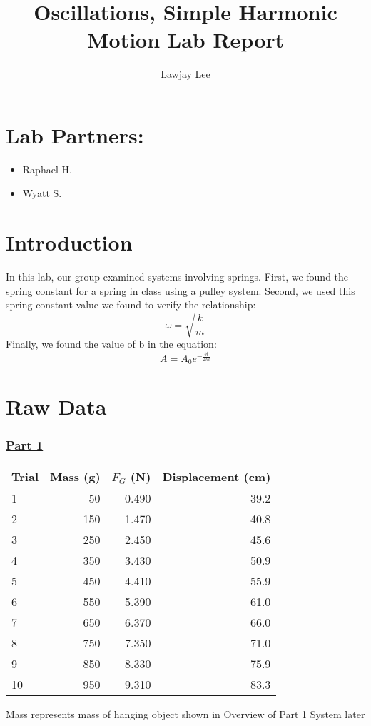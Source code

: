 \documentclass[fleqn]{article}
\title{Oscillations, Simple Harmonic Motion Lab Report}
\author{Lawjay Lee}
\date{}
\begin{document}
\maketitle

\section*{Lab Partners:}
\begin{itemize}
	\item Raphael H.
	\item Wyatt S.
\end{itemize}

\section*{Introduction}
In this lab, our group examined systems involving springs. First, we found the spring constant for a spring in class using a pulley system. Second, we used this spring constant value we found to verify the relationship:
\[ \omega = \sqrt{\frac{k}{m} }  \]
Finally, we found the value of b in the equation:
\[ A = A_0e^{- \frac{bt}{2m} } \]

\section*{Raw Data}
\subsubsection*{\underline{Part 1}}
\begin{table}[H]
	\setlength{\extrarowheight}{2pt}
	\begin{tabular}{|l|r|r|r|}
		\hline
		Trial & Mass (g) & $F_G$ (N) & Displacement (cm) \\ \hline
		1     & 50       & 0.490     & 39.2              \\ \hline
		2     & 150      & 1.470     & 40.8              \\ \hline
		3     & 250      & 2.450     & 45.6              \\ \hline
		4     & 350      & 3.430     & 50.9              \\ \hline
		5     & 450      & 4.410     & 55.9              \\ \hline
		6     & 550      & 5.390     & 61.0              \\ \hline
		7     & 650      & 6.370     & 66.0              \\ \hline
		8     & 750      & 7.350     & 71.0              \\ \hline
		9     & 850      & 8.330     & 75.9              \\ \hline
		10    & 950      & 9.310     & 83.3              \\ \hline
	\end{tabular}
\end{table}
Mass represents mass of hanging object shown in Overview of Part 1 System later
\end{document}
